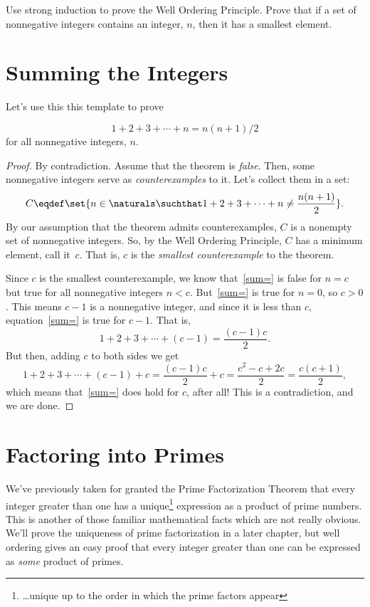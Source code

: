 \begin{notesproblem}
Use strong induction to prove the Well Ordering Principle. \hint Prove
that if a set of nonnegative integers contains an integer, $n$, then it
has a smallest element.
\end{notesproblem}
\fi

\section{Summing the Integers}
 Let's use this this template to prove %

\begin{theorem*}\label{sum-to-n}
\begin{equation}\label{sum=}
1 + 2 + 3 + \cdots + n = n(n+1)/2
\end{equation}
for all nonnegative integers, $n$.
\end{theorem*}

\begin{proof}
By contradiction.  Assume that the theorem is
\emph{false}.  Then, some nonnegative integers serve as
\emph{counterexamples} to it. Let's collect them in a set: 
\[
C \eqdef \set{n\in\naturals \suchthat 
        1 + 2 + 3 + \cdots + n \neq \frac{n(n+1)}{2}}.
\]
By our assumption that the theorem admits counterexamples, $C$ is a
nonempty set of nonnegative integers.  So, by the Well Ordering Principle,
$C$ has a minimum element, call it~$c$.  That is, $c$ is the
\emph{smallest counterexample} to the theorem.

Since $c$ is the smallest counterexample, we know that~\eqref{sum=} is
false for $n=c$ but true for all nonnegative integers $n<c$.
But~\eqref{sum=} is true for $n=0$, so $c > 0$.  This means $c-1$ is a
nonnegative integer, and since it is less than $c$, equation~\eqref{sum=}
is true for $c-1$.  That is,
\[
        1 + 2 + 3 + \cdots + (c-1) = \frac{(c-1)c}{2}.
\]
But then, adding $c$ to both sides we get
\[
1 + 2 + 3 + \cdots + (c-1) + c 
        = \frac{(c-1)c}{2} + c
        = \frac{c^2 - c + 2c}{2} 
        = \frac{c(c+1)}{2},
\]
which means that~\eqref{sum=} does hold for $c$, after all!  This is a
contradiction, and we are done.
\end{proof}

\section{Factoring into Primes}

We've previously taken for granted the Prime Factorization Theorem that
every integer greater than one has a unique\footnote{\dots unique up to the
  order in which the prime factors appear} expression as a product of
prime numbers.  This is another of those familiar mathematical facts which
are not really obvious.  We'll prove the uniqueness of prime factorization
in a later chapter, but well ordering gives an easy proof that every
integer greater than one can be expressed as \emph{some} product of
primes.

